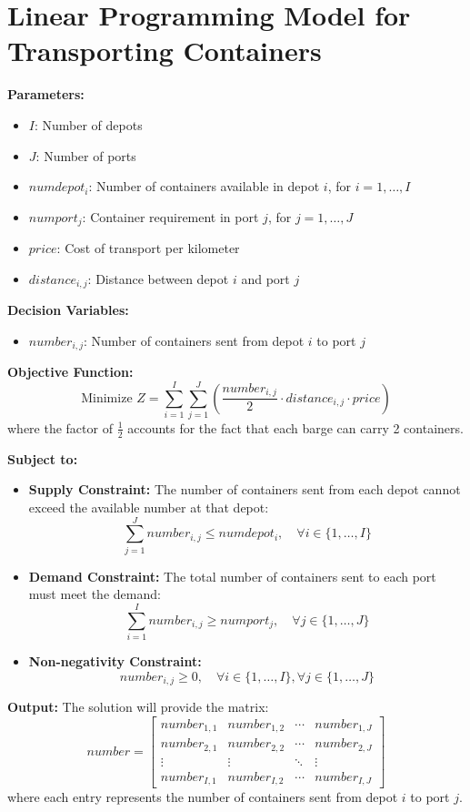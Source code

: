 \documentclass{article}
\begin{document}
\section*{Linear Programming Model for Transporting Containers}

\textbf{Parameters:}
\begin{itemize}
    \item $I$: Number of depots
    \item $J$: Number of ports
    \item $numdepot_i$: Number of containers available in depot $i$, for $i = 1, \ldots, I$
    \item $numport_j$: Container requirement in port $j$, for $j = 1, \ldots, J$
    \item $price$: Cost of transport per kilometer 
    \item $distance_{i,j}$: Distance between depot $i$ and port $j$ 
\end{itemize}

\textbf{Decision Variables:}
\begin{itemize}
    \item $number_{i,j}$: Number of containers sent from depot $i$ to port $j$
\end{itemize}

\textbf{Objective Function:}
\[
\text{Minimize } Z = \sum_{i=1}^{I} \sum_{j=1}^{J} \left( \frac{number_{i,j}}{2} \cdot distance_{i,j} \cdot price \right)
\]
where the factor of $\frac{1}{2}$ accounts for the fact that each barge can carry 2 containers.

\textbf{Subject to:}
\begin{itemize}
    \item \textbf{Supply Constraint:} The number of containers sent from each depot cannot exceed the available number at that depot:
    \[
    \sum_{j=1}^{J} number_{i,j} \leq numdepot_i, \quad \forall i \in \{1, \ldots, I\}
    \]

    \item \textbf{Demand Constraint:} The total number of containers sent to each port must meet the demand:
    \[
    \sum_{i=1}^{I} number_{i,j} \geq numport_j, \quad \forall j \in \{1, \ldots, J\}
    \]

    \item \textbf{Non-negativity Constraint:}
    \[
    number_{i,j} \geq 0, \quad \forall i \in \{1, \ldots, I\}, \forall j \in \{1, \ldots, J\}
    \]
\end{itemize}

\textbf{Output:}
The solution will provide the matrix:
\[
number = \begin{bmatrix}
number_{1,1} & number_{1,2} & \cdots & number_{1,J} \\
number_{2,1} & number_{2,2} & \cdots & number_{2,J} \\
\vdots & \vdots & \ddots & \vdots \\
number_{I,1} & number_{I,2} & \cdots & number_{I,J}
\end{bmatrix}
\]
where each entry represents the number of containers sent from depot $i$ to port $j$.
\end{document}

